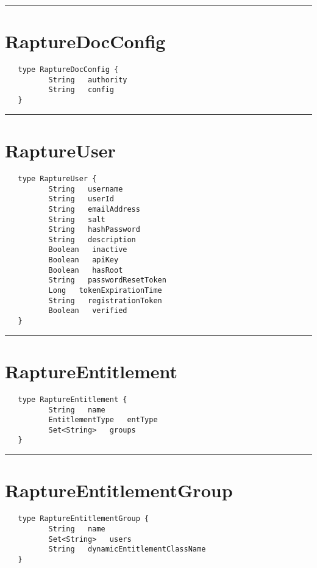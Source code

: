 \rule{12cm}{2pt}
\section{RaptureDocConfig}
\label{type:RaptureDocConfig}

\begin{verbatim}
   type RaptureDocConfig {
          String   authority
          String   config
   }
\end{verbatim}

\rule{12cm}{2pt}
\section{RaptureUser}
\label{type:RaptureUser}

\begin{verbatim}
   type RaptureUser {
          String   username
          String   userId
          String   emailAddress
          String   salt
          String   hashPassword
          String   description
          Boolean   inactive
          Boolean   apiKey
          Boolean   hasRoot
          String   passwordResetToken
          Long   tokenExpirationTime
          String   registrationToken
          Boolean   verified
   }
\end{verbatim}

\rule{12cm}{2pt}
\section{RaptureEntitlement}
\label{type:RaptureEntitlement}

\begin{verbatim}
   type RaptureEntitlement {
          String   name
          EntitlementType   entType
          Set<String>   groups
   }
\end{verbatim}

\rule{12cm}{2pt}
\section{RaptureEntitlementGroup}
\label{type:RaptureEntitlementGroup}

\begin{verbatim}
   type RaptureEntitlementGroup {
          String   name
          Set<String>   users
          String   dynamicEntitlementClassName
   }
\end{verbatim}

